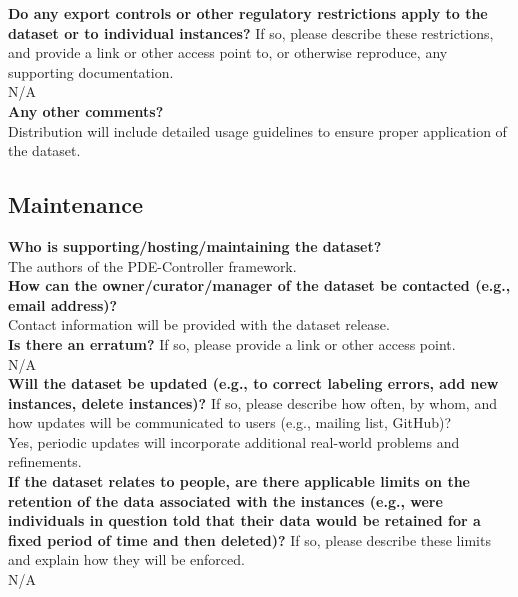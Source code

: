     \textcolor{\sectioncolor}{\textbf{Do any export controls or other regulatory restrictions apply to the
    dataset or to individual instances?
    }
    If so, please describe these restrictions, and provide a link or other
    access point to, or otherwise reproduce, any supporting documentation.
    } \\
    N/A \\

    \textcolor{\sectioncolor}{\textbf{Any other comments?
    }} \\
    Distribution will include detailed usage guidelines to ensure proper application of the dataset. \\

\subsection{Maintenance}

    \textcolor{\sectioncolor}{\textbf{Who is supporting/hosting/maintaining the dataset?
    }
    } \\
    The authors of the PDE-Controller framework. \\

    \textcolor{\sectioncolor}{\textbf{How can the owner/curator/manager of the dataset be contacted (e.g., email
    address)?
    }
    } \\
    Contact information will be provided with the dataset release. \\

    \textcolor{\sectioncolor}{\textbf{Is there an erratum?
    }
    If so, please provide a link or other access point.
    } \\
    N/A \\

    \textcolor{\sectioncolor}{\textbf{Will the dataset be updated (e.g., to correct labeling errors, add new
    instances, delete instances)?
    }
    If so, please describe how often, by whom, and how updates will be
    communicated to users (e.g., mailing list, GitHub)?
    } \\
    Yes, periodic updates will incorporate additional real-world problems and refinements. \\

    \textcolor{\sectioncolor}{\textbf{If the dataset relates to people, are there applicable limits on the
    retention of the data associated with the instances (e.g., were individuals
    in question told that their data would be retained for a fixed period of
    time and then deleted)?
    }
    If so, please describe these limits and explain how they will be enforced.
    } \\
    N/A \\

